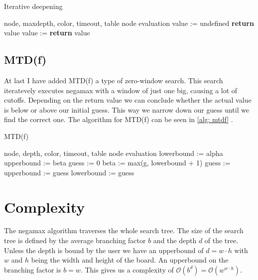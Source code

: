 \documentclass[a4paper]{article}
\begin{document}
\begin{algorithm}
	\caption{Iterative deepening}
	\label{alg: iterative deepening}
	\begin{algorithmic}[1]
		\Require node, maxdepth, color, timeout, table
		\Ensure node evaluation
			\State value := undefined
					\State \textbf{return} value
				\EndIf
				\State value := 
					\State \textbf{return} value
				\EndIf
			\EndFor
		\EndFunction
	\end{algorithmic}
\end{algorithm}

\subsection{MTD(f)}
At last I have added MTD(f) a type of zero-window search. This search
iteratevely executes negamax with a window of just one big, causing a lot of
cutoffs. Depending on the return value we can conclude whether the actual value
is below or above our initial guess. This way we narrow down our guess until we
find the correct one. The algorithm for MTD(f) can be seen in \ref{alg: mtdf}
\cite{wiki:mtdf}.

\begin{algorithm}
	\caption{MTD(f)}
	\label{alg: mtdf}
	\begin{algorithmic}[1]
		\Require node, depth, color, timeout, table
		\Ensure node evaluation
			\State lowerbound := alpha
			\State upperbound := beta
			\State guess := 0
				\State beta := max(g, lowerbound + 1)
				\State guess := 
					\State upperbound := guess
				\Else
					\State lowerbound := guess
				\EndIf
			\EndWhile
		\EndFunction
	\end{algorithmic}
\end{algorithm}

\section{Complexity}
The negamax algorithm traverses the whole search tree. The size of the search
tree is defined by the average branching factor $b$ and the depth $d$ of the
tree. Unless the depth is bound by the user we have an upperbound of $d = w
\cdot h$ with $w$ and $h$ being the width and height of the board. An
upperbound on the branching factor is $b = w$. This gives us a complexity of
$\mathcal{O}(b^d) = \mathcal{O}(w^{w \cdot h})$.
\end{document}
